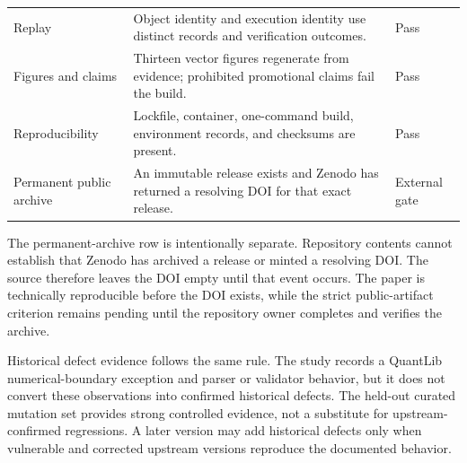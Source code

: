 \begin{table}[t]
\begin{tabularx}{\linewidth}{>{\raggedright\arraybackslash}p{.25\linewidth}>{\raggedright\arraybackslash}p{.55\linewidth}l}
Replay & Object identity and execution identity use distinct records and verification outcomes. & Pass \\
Figures and claims & Thirteen vector figures regenerate from evidence; prohibited promotional claims fail the build. & Pass \\
Reproducibility & Lockfile, container, one-command build, environment records, and checksums are present. & Pass \\
Permanent public archive & An immutable release exists and Zenodo has returned a resolving DOI for that exact release. & External gate \\
\bottomrule
\end{tabularx}
\end{table}

The permanent-archive row is intentionally separate. Repository contents cannot establish that Zenodo has archived a release or minted a resolving DOI. The source therefore leaves the DOI empty until that event occurs. The paper is technically reproducible before the DOI exists, while the strict public-artifact criterion remains pending until the repository owner completes and verifies the archive.

Historical defect evidence follows the same rule. The study records a QuantLib numerical-boundary exception and parser or validator behavior, but it does not convert these observations into confirmed historical defects. The held-out curated mutation set provides strong controlled evidence, not a substitute for upstream-confirmed regressions. A later version may add historical defects only when vulnerable and corrected upstream versions reproduce the documented behavior.
